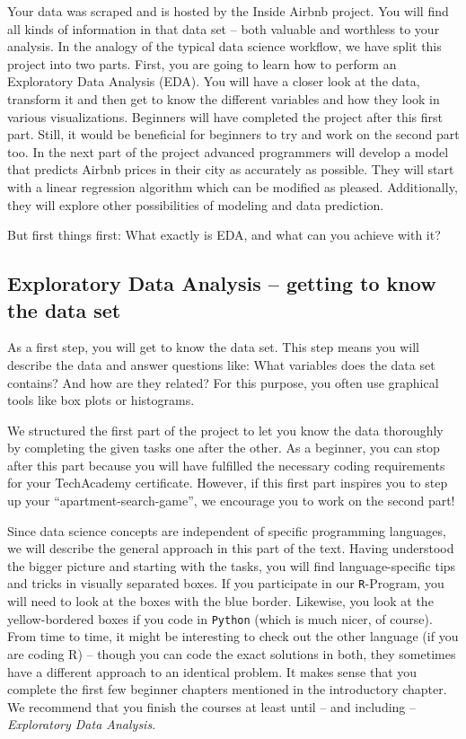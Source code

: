 \documentclass[
  11pt,
]{article}
\begin{document}
Your data was scraped and is hosted by the Inside Airbnb project. You will find all kinds of information in that data set -- both valuable and worthless to your analysis.
In the analogy of the typical data science workflow, we have split this project into two parts. First, you are going to learn how to perform an Exploratory Data Analysis (EDA). You will have a closer look at the data, transform it and then get to know the different variables and how they look in various visualizations. Beginners will have completed the project after this first part. Still, it would be beneficial for beginners to try and work on the second part too. In the next part of the project advanced programmers will develop a model that predicts Airbnb prices in their city as accurately as possible. They will start with a linear regression algorithm which can be modified as pleased. Additionally, they will explore other possibilities of modeling and data prediction.

But first things first: What exactly is EDA, and what can you achieve with it?

\hypertarget{exploratory-data-analysis-getting-to-know-the-data-set}{%
\subsection{Exploratory Data Analysis -- getting to know the data set}\label{exploratory-data-analysis-getting-to-know-the-data-set}}

As a first step, you will get to know the data set. This step means you will describe the data and answer questions like: What variables does the data set contains? And how are they related? For this purpose, you often use graphical tools like box plots or histograms.

We structured the first part of the project to let you know the data thoroughly by completing the given tasks one after the other. As a beginner, you can stop after this part because you will have fulfilled the necessary coding requirements for your TechAcademy certificate. However, if this first part inspires you to step up your ``apartment-search-game'', we encourage you to work on the second part!

Since data science concepts are independent of specific programming languages, we will describe the general approach in this part of the text. Having understood the bigger picture and starting with the tasks, you will find language-specific tips and tricks in visually separated boxes. If you participate in our \texttt{R}-Program, you will need to look at the boxes with the blue border. Likewise, you look at the yellow-bordered boxes if you code in \texttt{Python} (which is much nicer, of course). From time to time, it might be interesting to check out the other language (if you are coding R) -- though you can code the exact solutions in both, they sometimes have a different approach to an identical problem. It makes sense that you complete the first few beginner chapters mentioned in the introductory chapter. We recommend that you finish the courses at least until -- and including -- \emph{Exploratory Data Analysis}.
\end{document}
